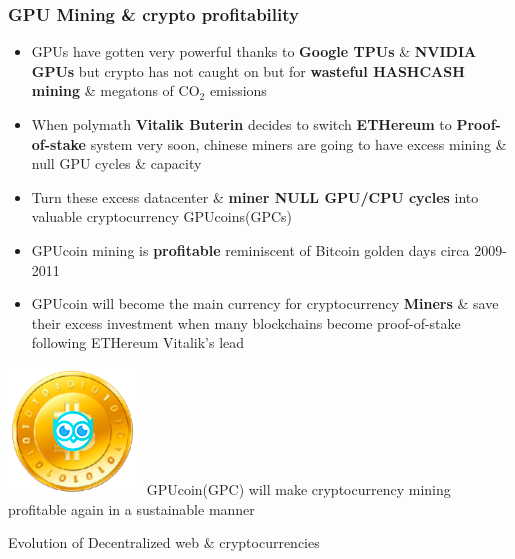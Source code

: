 \documentclass[10pt,handout]{beamer}
\begin{document}
\begin{frame}[t]\frametitle{GPU Mining \& crypto profitability}
\begin{itemize}[<+-| alert@+>]
\item GPUs have gotten very powerful thanks to \textbf{Google TPUs} \& \textbf{NVIDIA GPUs} but crypto has  not caught on but for \textbf{wasteful HASHCASH mining} \& megatons of CO$_2$ emissions
\item When polymath \textbf{Vitalik Buterin} decides to switch \textbf{ETHereum} to \textbf{Proof-of-stake} system very soon, chinese miners are going to have excess mining \& null GPU cycles \& capacity
\item Turn these excess datacenter \& \textbf{miner NULL GPU/CPU cycles} into valuable cryptocurrency GPUcoins(GPCs)
\item GPUcoin mining is \textbf{profitable} reminiscent of Bitcoin golden days circa 2009-2011
\item GPUcoin will become the main currency for cryptocurrency \textbf{Miners} \& save their excess investment when many blockchains become proof-of-stake following ETHereum Vitalik's lead
\end{itemize}

 \pause
 \includegraphics[scale=0.1]{static/hootcoin} 
\Large{ GPUcoin(GPC) will make cryptocurrency mining profitable again in a sustainable manner}


\end{frame}

\begin{frame}[t]{Evolution of Decentralized web \& cryptocurrencies}
 
\end{frame} 
\end{document}
